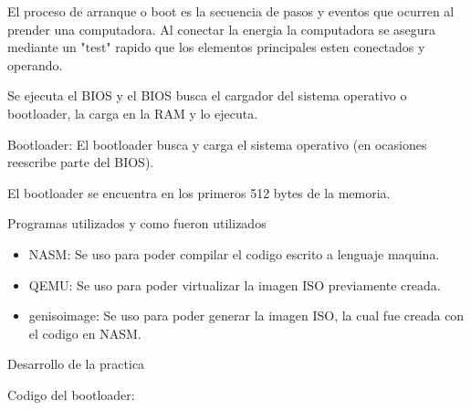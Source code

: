 \documentclass[12pt, a4paper]{report}
\begin{document}
\begin{flushleft}


El proceso de arranque o boot es la secuencia de pasos y eventos que ocurren al prender una computadora. Al conectar la energia la computadora se asegura mediante un "test" rapido que los elementos principales esten conectados y operando.


\bigskip

Se ejecuta el BIOS y el BIOS busca el cargador del sistema operativo o bootloader, la carga en la RAM y lo ejecuta.


\bigskip

Bootloader: El bootloader busca y carga el sistema operativo (en ocasiones reescribe parte del BIOS).

\bigskip
\bigskip

El bootloader se encuentra en los primeros 512 bytes de la memoria.
\end{flushleft}




\newpage

\begin{center}
Programas utilizados y como fueron utilizados
\end{center}

\bigskip
\bigskip

\begin{flushleft}
\begin{itemize}
\item NASM: Se uso para poder compilar el codigo escrito a lenguaje maquina.
\item QEMU: Se uso para poder virtualizar la imagen ISO previamente creada.
\item genisoimage: Se uso para poder generar la imagen ISO, la cual fue creada con el codigo en NASM.
\end{itemize}
\end{flushleft}

\newpage

\begin{center}
Desarrollo de la practica
\end{center}

\bigskip
\bigskip

\begin{flushleft}
Codigo del bootloader:

\bigskip
\bigskip


\end{flushleft}

\bigskip
\bigskip
\end{document}
